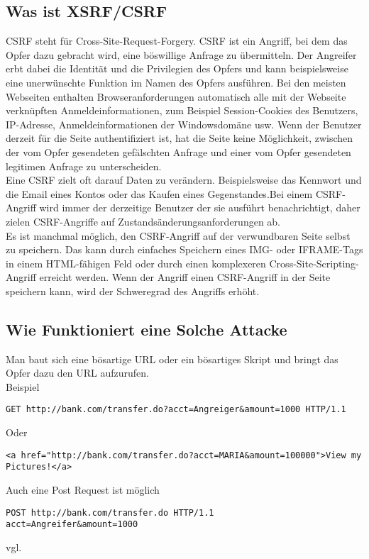 {\subsection{Was ist XSRF/CSRF}
\label{sec:xsrf_what}
CSRF steht für Cross-Site-Request-Forgery. CSRF ist ein Angriff, bei dem das Opfer dazu gebracht wird, eine böswillige Anfrage zu übermitteln. Der Angreifer erbt dabei die Identität und die Privilegien des Opfers und kann beispielsweise eine unerwünschte Funktion im Namen des Opfers ausführen. Bei den meisten Webseiten enthalten Browseranforderungen automatisch alle mit der Webseite verknüpften Anmeldeinformationen, zum Beispiel Session-Cookies des Benutzers, IP-Adresse, Anmeldeinformationen der Windowsdomäne usw. Wenn der Benutzer derzeit für die Seite authentifiziert ist, hat die Seite keine Möglichkeit, zwischen der vom Opfer gesendeten gefälschten Anfrage und einer vom Opfer gesendeten legitimen Anfrage zu unterscheiden.
\\
Eine CSRF zielt oft darauf Daten zu verändern. Beispielsweise das Kennwort und die Email eines Kontos oder das Kaufen eines Gegenstandes.Bei einem CSRF-Angriff wird immer der derzeitige Benutzer der sie ausführt benachrichtigt, daher zielen CSRF-Angriffe auf Zustandsänderungsanforderungen ab.
\\
Es ist manchmal möglich, den CSRF-Angriff auf der verwundbaren Seite selbst zu speichern. Das kann durch einfaches Speichern eines IMG- oder IFRAME-Tags in einem HTML-fähigen Feld oder durch einen komplexeren Cross-Site-Scripting-Angriff erreicht werden. Wenn der Angriff einen CSRF-Angriff in der Seite speichern kann, wird der Schweregrad des Angriffs erhöht. 
\subsection{Wie Funktioniert eine Solche Attacke}
\label{sec:xsrf_how}
Man baut sich eine bösartige URL oder ein bösartiges Skript und bringt das Opfer dazu den URL aufzurufen. 
\\
Beispiel
\begin{lstlisting}
GET http://bank.com/transfer.do?acct=Angreiger&amount=1000 HTTP/1.1
\end{lstlisting}
Oder
\begin{lstlisting}
<a href="http://bank.com/transfer.do?acct=MARIA&amount=100000">View my Pictures!</a>
\end{lstlisting}
Auch eine Post Request ist möglich
\\
\begin{lstlisting}
POST http://bank.com/transfer.do HTTP/1.1
acct=Angreifer&amount=1000
\end{lstlisting}
vgl. \textcite{CSRF}
}
